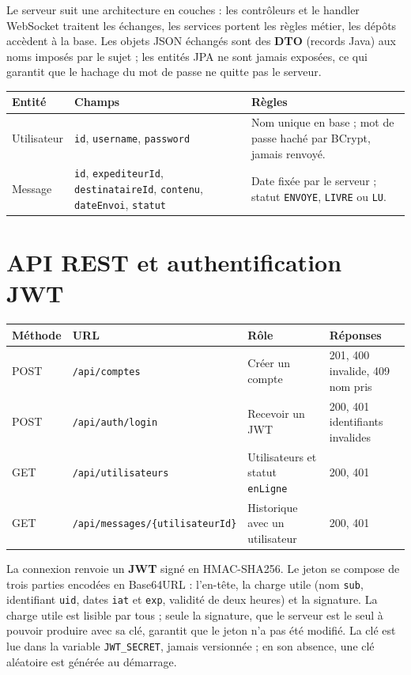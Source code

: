 \documentclass[11pt,a4paper]{article}
\newcommand{\tachesection}[1]{%
\needspace{6\baselineskip}%
\color{tachenavy}%
\section{#1}%
\color{black}%
}
\begin{document}
Le serveur suit une architecture en couches : les contrôleurs et le handler WebSocket traitent les échanges, les services portent les règles métier, les dépôts accèdent à la base. Les objets JSON échangés sont des \textbf{DTO} (records Java) aux noms imposés par le sujet ; les entités JPA ne sont jamais exposées, ce qui garantit que le hachage du mot de passe ne quitte pas le serveur.

{\small\renewcommand{\arraystretch}{1.35}
\begin{tabular}{@{}L{2.3cm}L{6.6cm}L{6.3cm}@{}}
\toprule
\textbf{Entité} & \textbf{Champs} & \textbf{Règles} \\
\midrule
Utilisateur & \texttt{id}, \texttt{username}, \texttt{password} & Nom unique en base ; mot de passe haché par BCrypt, jamais renvoyé. \\
Message & \texttt{id}, \texttt{expediteurId}, \texttt{destinataireId}, \texttt{contenu}, \texttt{dateEnvoi}, \texttt{statut} & Date fixée par le serveur ; statut \texttt{ENVOYE}, \texttt{LIVRE} ou \texttt{LU}. \\
\bottomrule
\end{tabular}}

\FloatBarrier
\tachesection{API REST et authentification JWT}

{\small\renewcommand{\arraystretch}{1.35}
\begin{tabular}{@{}L{1.7cm}L{5.5cm}L{3.9cm}L{4.2cm}@{}}
\toprule
\textbf{Méthode} & \textbf{URL} & \textbf{Rôle} & \textbf{Réponses} \\
\midrule
POST & \texttt{/api/comptes} & Créer un compte & 201, 400 invalide, 409 nom pris \\
POST & \texttt{/api/auth/login} & Recevoir un JWT & 200, 401 identifiants invalides \\
GET & \texttt{/api/utilisateurs} & Utilisateurs et statut \texttt{enLigne} & 200, 401 \\
GET & \texttt{/api/messages/\{utilisateurId\}} & Historique avec un utilisateur & 200, 401 \\
\bottomrule
\end{tabular}}

La connexion renvoie un \textbf{JWT} signé en HMAC-SHA256. Le jeton se compose de trois parties encodées en Base64URL : l'en-tête, la charge utile (nom \texttt{sub}, identifiant \texttt{uid}, dates \texttt{iat} et \texttt{exp}, validité de deux heures) et la signature. La charge utile est lisible par tous ; seule la signature, que le serveur est le seul à pouvoir produire avec sa clé, garantit que le jeton n'a pas été modifié. La clé est lue dans la variable \texttt{JWT\_SECRET}, jamais versionnée ; en son absence, une clé aléatoire est générée au démarrage.
\end{document}
